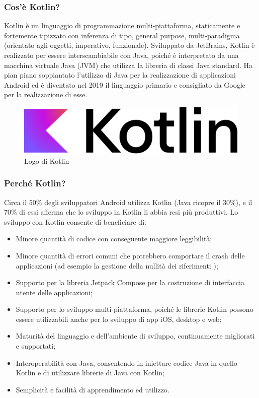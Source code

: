             \subsubsection{Cos'è Kotlin? \cite{Wikipedia2}}
                Kotlin è un linguaggio di programmazione multi-piattaforma, staticamente e fortemente tipizzato con inferenza di tipo, general purpose, multi-paradigma (orientato agli oggetti, imperativo, funzionale). Sviluppato da JetBrains, Kotlin è realizzato per essere interscambiabile con Java, poiché è interpretato da una macchina virtuale Java (JVM) che utilizza la libreria di classi Java standard. Ha pian piano soppiantato l'utilizzo di Java per la realizzazione di applicazioni Android ed è diventato nel 2019 il linguaggio primario e consigliato da Google per la realizzazione di esse.
            \begin{figure}[htbp!]
                \centering
                \includegraphics[width=0.45\linewidth]{Immagini/System Design/Kotlin.png}
                \caption{Logo di Kotlin}
            \end{figure}
            \subsubsection{Perché Kotlin? \cite{JetBrains1}}
                Circa il 50\% degli sviluppatori Android utilizza Kotlin (Java ricopre il 30\%), e il 70\% di essi afferma che lo sviluppo in Kotlin li abbia resi più produttivi. Lo sviluppo con Kotlin consente di beneficiare di:
                \begin{itemize}
                    \item Minore quantità di codice con conseguente maggiore leggibilità;
                    \item Minore quantità di errori comuni che potrebbero comportare il crash delle applicazioni (ad esempio la gestione della nullità dei riferimenti \cite{JetBrains2});
                    \item Supporto per la libreria Jetpack Compose per la costruzione di interfaccia utente delle applicazioni;
                    \item Supporto per lo sviluppo multi-piattaforma, poiché le librerie Kotlin possono essere utilizzabili anche per lo sviluppo di app iOS, desktop e web;
                    \item Maturità del linguaggio e dell'ambiente di sviluppo, continuamente migliorati e supportati;
                    \item Interoperabilità con Java, consentendo in iniettare codice Java in quello Kotlin e di utilizzare librerie di Java con Kotlin;
                    \item Semplicità e facilità di apprendimento ed utilizzo.
                \end{itemize}
                
